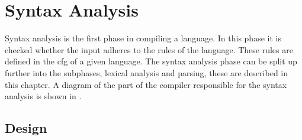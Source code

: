 \chapter{Syntax Analysis}\label{sec:syntaxAnalysis}
Syntax analysis is the first phase in compiling a language.
In this phase it is checked whether the input adheres to the rules of the language.
These rules are defined in the \acrshort{cfg} of a given language.
The syntax analysis phase can be split up further into the subphases, lexical analysis and parsing, these are described in this chapter.
A diagram of the part of the compiler responsible for the syntax analysis is shown in .


\section{Design}








